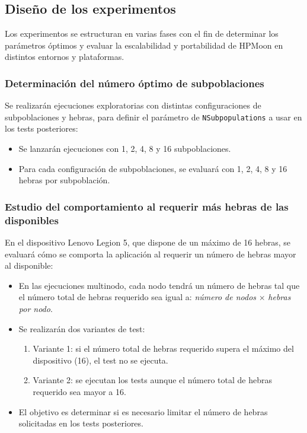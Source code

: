 \subsection{Diseño de los experimentos}\label{subsec:diseno_experimentos_detallado}

Los experimentos se estructuran en varias fases con el fin de determinar los parámetros óptimos y evaluar la escalabilidad y portabilidad de HPMoon en distintos entornos y plataformas.

\subsubsection{Determinación del número óptimo de subpoblaciones}

Se realizarán ejecuciones exploratorias con distintas configuraciones de subpoblaciones y hebras, para definir el parámetro de \texttt{NSubpopulations} a usar en los tests posteriores:

\begin{itemize}
    \item Se lanzarán ejecuciones con 1, 2, 4, 8 y 16 subpoblaciones.
    \item Para cada configuración de subpoblaciones, se evaluará con 1, 2, 4, 8 y 16 hebras por subpoblación.
\end{itemize}

\subsubsection{Estudio del comportamiento al requerir más hebras de las disponibles}

En el dispositivo Lenovo Legion 5, que dispone de un máximo de 16 hebras, se evaluará cómo se comporta la aplicación al requerir un número de hebras mayor al disponible:

\begin{itemize}
    \item En las ejecuciones multinodo, cada nodo tendrá un número de hebras tal que el número total de hebras requerido sea igual a: \textit{número de nodos} $\times$ \textit{hebras por nodo}.
    \item Se realizarán dos variantes de test:
          \begin{enumerate}
              \item Variante 1: si el número total de hebras requerido supera el máximo del dispositivo (16), el test no se ejecuta.
              \item Variante 2: se ejecutan los tests aunque el número total de hebras requerido sea mayor a 16.
          \end{enumerate}
    \item El objetivo es determinar si es necesario limitar el número de hebras solicitadas en los tests posteriores.
\end{itemize}

